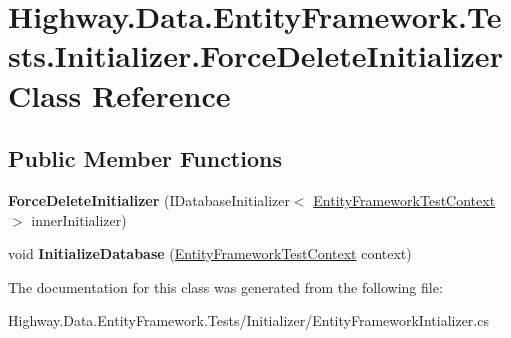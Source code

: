 \hypertarget{class_highway_1_1_data_1_1_entity_framework_1_1_tests_1_1_initializer_1_1_force_delete_initializer}{\section{Highway.\-Data.\-Entity\-Framework.\-Tests.\-Initializer.\-Force\-Delete\-Initializer Class Reference}
\label{class_highway_1_1_data_1_1_entity_framework_1_1_tests_1_1_initializer_1_1_force_delete_initializer}
}
\subsection*{Public Member Functions}
\begin{DoxyCompactItemize}
\item 
\hypertarget{class_highway_1_1_data_1_1_entity_framework_1_1_tests_1_1_initializer_1_1_force_delete_initializer_a1ab96914d957e641e050d3a846042591}{{\bfseries Force\-Delete\-Initializer} (I\-Database\-Initializer$<$ \hyperlink{class_highway_1_1_data_1_1_entity_framework_1_1_tests_1_1_unit_tests_1_1_entity_framework_test_context}{Entity\-Framework\-Test\-Context} $>$ inner\-Initializer)}\label{class_highway_1_1_data_1_1_entity_framework_1_1_tests_1_1_initializer_1_1_force_delete_initializer_a1ab96914d957e641e050d3a846042591}

\item 
\hypertarget{class_highway_1_1_data_1_1_entity_framework_1_1_tests_1_1_initializer_1_1_force_delete_initializer_a4f8e9f5593fcaa028c0c7aab95ad17da}{void {\bfseries Initialize\-Database} (\hyperlink{class_highway_1_1_data_1_1_entity_framework_1_1_tests_1_1_unit_tests_1_1_entity_framework_test_context}{Entity\-Framework\-Test\-Context} context)}\label{class_highway_1_1_data_1_1_entity_framework_1_1_tests_1_1_initializer_1_1_force_delete_initializer_a4f8e9f5593fcaa028c0c7aab95ad17da}

\end{DoxyCompactItemize}


The documentation for this class was generated from the following file\-:\begin{DoxyCompactItemize}
\item 
Highway.\-Data.\-Entity\-Framework.\-Tests/\-Initializer/Entity\-Framework\-Intializer.\-cs\end{DoxyCompactItemize}
